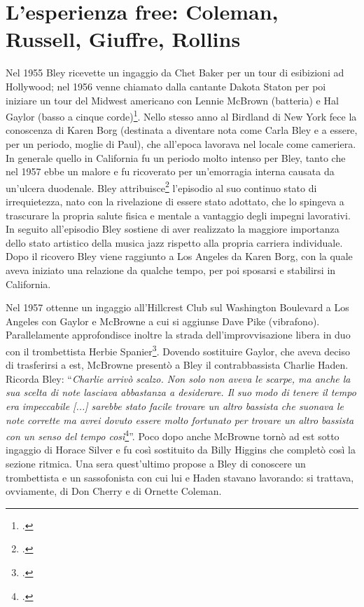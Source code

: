 \section{L'esperienza free: Coleman, Russell, Giuffre, Rollins}
Nel 1955 Bley ricevette un ingaggio da Chet Baker per un tour di esibizioni ad Hollywood; nel 1956 venne chiamato dalla cantante Dakota Staton per poi iniziare un tour del Midwest americano con Lennie McBrown (batteria) e Hal Gaylor (basso a cinque corde)\footcite[49]{stopping}. Nello stesso anno al Birdland di New York fece la conoscenza di Karen Borg (destinata a diventare nota come Carla Bley e a essere, per un periodo, moglie di Paul), che all'epoca lavorava nel locale come cameriera. \\
In generale quello in California fu un periodo molto intenso per Bley, tanto che nel 1957 ebbe un malore e fu ricoverato per un'emorragia interna causata da un'ulcera duodenale. Bley attribuisce\footcite[54]{stopping} l'episodio al suo continuo stato di irrequietezza, nato con la rivelazione di essere stato adottato, che lo spingeva a trascurare la propria salute fisica e mentale a vantaggio degli impegni lavorativi. In seguito all'episodio Bley sostiene di aver realizzato la maggiore importanza dello stato artistico della musica jazz rispetto alla propria carriera individuale. Dopo il ricovero Bley viene raggiunto a Los Angeles da Karen Borg, con la quale aveva iniziato una relazione da qualche tempo, per poi sposarsi e stabilirsi in California.\par
Nel 1957 ottenne un ingaggio all'Hillcrest Club sul Washington Boulevard a Los Angeles con Gaylor e McBrowne a cui si aggiunse Dave Pike (vibrafono). Parallelamente approfondisce inoltre la strada dell'improvvisazione libera in duo con il trombettista Herbie Spanier\footcite[58]{stopping}. Dovendo sostituire Gaylor, che aveva deciso di trasferirsi a est, McBrowne presentò a Bley il contrabbassista Charlie Haden. Ricorda Bley: ``\textit{Charlie arrivò scalzo. Non solo non aveva le scarpe, ma anche la sua scelta di note lasciava abbastanza a desiderare. Il suo modo di tenere il tempo era impeccabile [...] sarebbe stato facile trovare un altro bassista che suonava le note corrette ma avrei dovuto essere molto fortunato per trovare un altro bassista con un senso del tempo così}\footcite[62]{stopping}''. Poco dopo anche McBrowne tornò ad est sotto ingaggio di Horace Silver e fu così sostituito da Billy Higgins che completò così la sezione ritmica. Una sera quest'ultimo propose a Bley di conoscere un trombettista e un sassofonista con cui lui e Haden stavano lavorando: si trattava, ovviamente, di Don Cherry e di Ornette Coleman.
